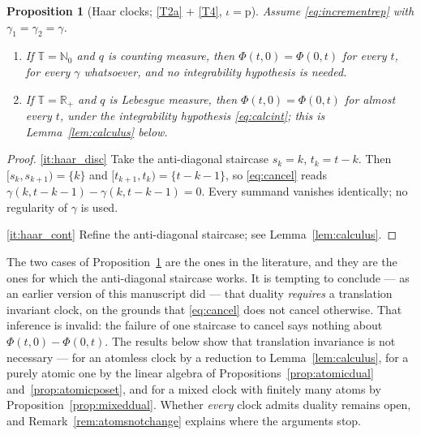 \documentclass[11pt,a4paper]{article}
\theoremstyle{plain}
\newtheorem{proposition}[theorem]{Proposition}
\theoremstyle{definition}
\theoremstyle{remark}
\newcommand{\R}{\mathbb{R}}
\newcommand{\N}{\mathbb{N}}
\newcommand{\Rp}{\R_+}
\newcommand{\T}{\mathbb{T}}                     %
\begin{document}
\begin{proposition}[Haar clocks; \eqref{T2a} + \eqref{T4}, $\iota = \mathrm{p}$]
  \label{prop:haar}
  Assume \eqref{eq:incrementrep} with $\gamma_1 = \gamma_2 = \gamma$.
  \begin{enumerate}[label=(\alph*)]
  \item \label{it:haar_disc}
    If $\T = \N_0$ and $q$ is counting measure, then $\Phi(t,0) = \Phi(0,t)$ for
    every $t$, for every $\gamma$ whatsoever, and no integrability hypothesis is
    needed.
  \item \label{it:haar_cont}
    If $\T = \Rp$ and $q$ is Lebesgue measure, then $\Phi(t,0) = \Phi(0,t)$ for
    almost every $t$, under the integrability hypothesis \eqref{eq:calcint};
    this is Lemma~\ref{lem:calculus} below.
  \end{enumerate}
\end{proposition}

\begin{proof}
  \ref{it:haar_disc}  Take the anti-diagonal staircase $s_k = k$,
  $t_k = t - k$.  Then $[s_k,s_{k+1}) = \{k\}$ and
  $[t_{k+1},t_k) = \{t-k-1\}$, so \eqref{eq:cancel} reads
  $\gamma(k,t-k-1) - \gamma(k,t-k-1) = 0$.  Every summand vanishes identically;
  no regularity of $\gamma$ is used.

  \ref{it:haar_cont}  Refine the anti-diagonal staircase; see
  Lemma~\ref{lem:calculus}.
\end{proof}

The two cases of Proposition~\ref{prop:haar} are the ones in the literature, and
they are the ones for which the anti-diagonal staircase works.  It is tempting to
conclude --- as an earlier version of this manuscript did --- that duality
\emph{requires} a translation invariant clock, on the grounds that
\eqref{eq:cancel} does not cancel otherwise.  That inference is invalid: the
failure of one staircase to cancel says nothing about $\Phi(t,0) - \Phi(0,t)$.
The results below show that translation invariance is not necessary --- for
an atomless clock by a reduction to Lemma~\ref{lem:calculus}, for a purely
atomic one by the linear algebra of Propositions~\ref{prop:atomicdual}
and~\ref{prop:atomicposet}, and for a mixed clock with finitely many atoms by
Proposition~\ref{prop:mixeddual}.  Whether \emph{every} clock
admits duality remains open, and Remark~\ref{rem:atomsnotchange} explains where
the arguments stop.
\end{document}
